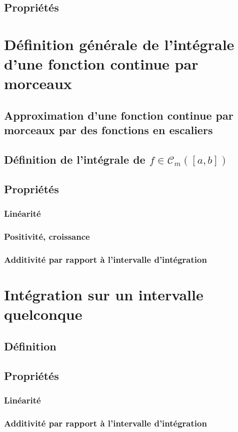 \documentclass[12pt,a4paper,french]{book}
\begin{document}
		\subsection{Propriétés}
	\section{Définition générale de l'intégrale d'une fonction continue par morceaux}
		\subsection{Approximation d'une fonction continue par morceaux par des fonctions en escaliers}
		\subsection{Définition de l'intégrale de $f \in \mathcal{C}_m([a,b])$}
		\subsection{Propriétés}
			\subsubsection{Linéarité}
			\subsubsection{Positivité, croissance}
			\subsubsection{Additivité par rapport à l'intervalle d'intégration}
	\section{Intégration sur un intervalle quelconque}
		\subsection{Définition}
		\subsection{Propriétés}
			\subsubsection{Linéarité}
			\subsubsection{Additivité par rapport à l'intervalle d'intégration}
\end{document}
